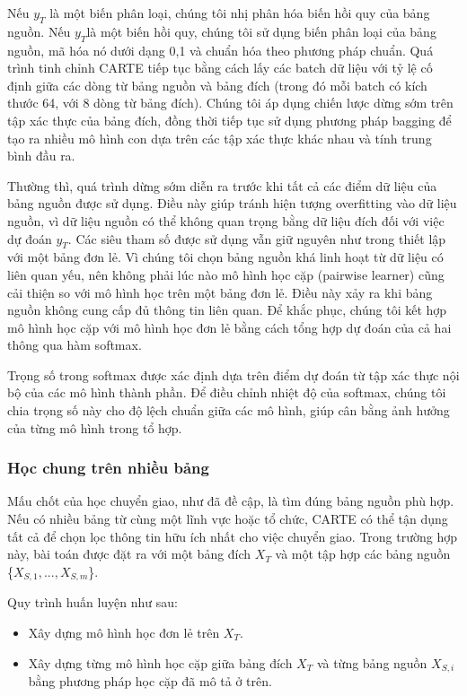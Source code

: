 \documentclass{article}
\begin{document}
Nếu $y_T$ là một biến phân loại, chúng tôi nhị phân hóa biến hồi quy của bảng nguồn.
Nếu $y_T$là một biến hồi quy, chúng tôi sử dụng biến phân loại của bảng nguồn, mã hóa nó dưới dạng {0,1} và chuẩn hóa theo phương pháp chuẩn.
Quá trình tinh chỉnh CARTE tiếp tục bằng cách lấy các batch dữ liệu với tỷ lệ cố định giữa các dòng từ bảng nguồn và bảng đích (trong đó mỗi batch có kích thước 64, với 8 dòng từ bảng đích). Chúng tôi áp dụng chiến lược dừng sớm trên tập xác thực của bảng đích, đồng thời tiếp tục sử dụng phương pháp bagging để tạo ra nhiều mô hình con dựa trên các tập xác thực khác nhau và tính trung bình đầu ra.

Thường thì, quá trình dừng sớm diễn ra trước khi tất cả các điểm dữ liệu của bảng nguồn được sử dụng. Điều này giúp tránh hiện tượng overfitting vào dữ liệu nguồn, vì dữ liệu nguồn có thể không quan trọng bằng dữ liệu đích đối với việc dự đoán $y_T$. Các siêu tham số được sử dụng vẫn giữ nguyên như trong thiết lập với một bảng đơn lẻ.
Vì chúng tôi chọn bảng nguồn khá linh hoạt từ dữ liệu có liên quan yếu, nên không phải lúc nào mô hình học cặp (pairwise learner) cũng cải thiện so với mô hình học trên một bảng đơn lẻ. Điều này xảy ra khi bảng nguồn không cung cấp đủ thông tin liên quan. Để khắc phục, chúng tôi kết hợp mô hình học cặp với mô hình học đơn lẻ bằng cách tổng hợp dự đoán của cả hai thông qua hàm softmax.

Trọng số trong softmax được xác định dựa trên điểm dự đoán từ tập xác thực nội bộ của các mô hình thành phần. Để điều chỉnh nhiệt độ của softmax, chúng tôi chia trọng số này cho độ lệch chuẩn giữa các mô hình, giúp cân bằng ảnh hưởng của từng mô hình trong tổ hợp.

\subsubsection{Học chung trên nhiều bảng}
Mấu chốt của học chuyển giao, như đã đề cập, là tìm đúng bảng nguồn phù hợp. Nếu có nhiều bảng từ cùng một lĩnh vực hoặc tổ chức, CARTE có thể tận dụng tất cả để chọn lọc thông tin hữu ích nhất cho việc chuyển giao. Trong trường hợp này, bài toán được đặt ra với một bảng đích $X_T$ và một tập hợp các bảng nguồn \{$X_{S,1}, ..., X_{S,m}$\}.

Quy trình huấn luyện như sau:
\begin{itemize}
    \item Xây dựng mô hình học đơn lẻ trên $X_T$.
    \item Xây dựng từng mô hình học cặp giữa bảng đích $X_T$ và từng bảng nguồn $X_{S,i}$ bằng phương pháp học cặp đã mô tả ở trên.
\end{itemize}
\end{document}

